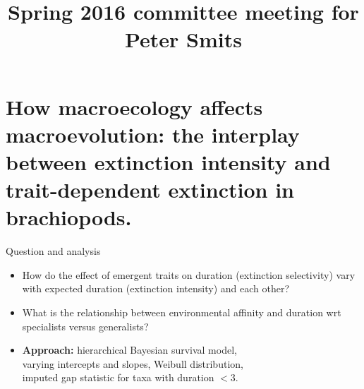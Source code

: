 \documentclass{beamer}
\title{Spring 2016 committee meeting for Peter Smits}
\author{}
\institute{}
\date{}
\begin{document}
\begin{frame}
  \maketitle
\end{frame}

\begin{frame}
  \tableofcontents
\end{frame}


\section{How macroecology affects macroevolution: the interplay between extinction intensity and trait-dependent extinction in brachiopods.}

\begin{frame}
  \begin{alertblock}{Question and analysis}
    \begin{itemize}
      \item How do the effect of emergent traits on duration (\alert{extinction selectivity}) vary with expected duration (\alert{extinction intensity}) and each other?
      \item What is the relationship between environmental affinity and duration wrt specialists versus generalists?
      \item \textbf{Approach:} hierarchical Bayesian survival model, \\varying intercepts and slopes, Weibull distribution, \\imputed gap statistic for taxa with duration \(< 3\).
    \end{itemize}
  \end{alertblock}
\end{frame}
\end{document}
